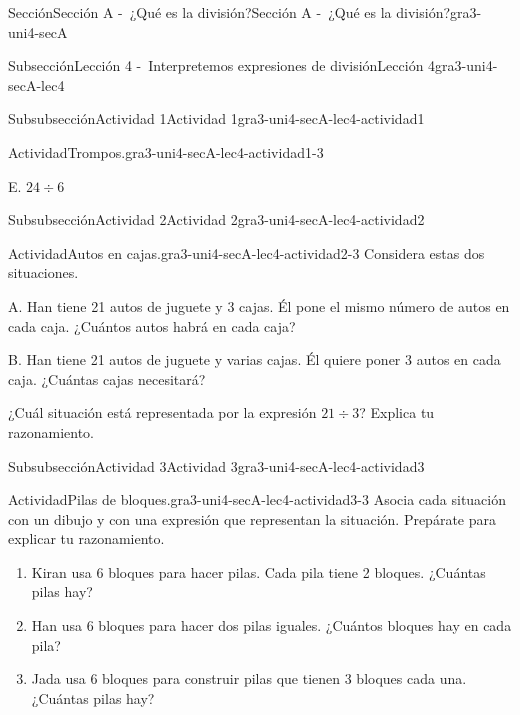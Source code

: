 \documentclass[twoside,10pt,]{article}
\begin{document}
\begin{sectionptx}{Sección}{Sección A -~¿Qué es la división?}{}{Sección A -~¿Qué es la división?}{}{}{gra3-uni4-secA}
\begin{subsectionptx}{Subsección}{Lección 4 -~Interpretemos expresiones de división}{}{Lección 4}{}{}{gra3-uni4-secA-lec4}
\begin{subsubsectionptx}{Subsubsección}{Actividad 1}{}{Actividad 1}{}{}{gra3-uni4-secA-lec4-actividad1}
\begin{activity}{Actividad}{Trompos.}{gra3-uni4-secA-lec4-actividad1-3}
\begin{sidebyside}{2}{0.05}{0}{0.15}
\begin{sbspanel}{0.2}
\par
E. \(24 \div 6\)%
\end{sbspanel}%
\end{sidebyside}%
\end{activity}%
\end{subsubsectionptx}
%
%
\typeout{************************************************}
\typeout{************************************************}
%
\begin{subsubsectionptx}{Subsubsección}{Actividad 2}{}{Actividad 2}{}{}{gra3-uni4-secA-lec4-actividad2}
\begin{activity}{Actividad}{Autos en cajas.}{gra3-uni4-secA-lec4-actividad2-3}%
Considera estas dos situaciones.%
\begin{sidebyside}{2}{0.05}{0.05}{0.1}%
\begin{sbspanel}{0.4}%
A. Han tiene 21 autos de juguete y 3 cajas. Él pone el mismo número de autos en cada caja. ¿Cuántos autos habrá en cada caja?%
\end{sbspanel}%
\begin{sbspanel}{0.4}%
\par
B. Han tiene 21 autos de juguete y varias cajas. Él quiere poner 3 autos en cada caja. ¿Cuántas cajas necesitará?%
\end{sbspanel}%
\end{sidebyside}%
\par
¿Cuál situación está representada por la expresión \(21\div 3\)? Explica tu razonamiento.%
\end{activity}%
\end{subsubsectionptx}
%
%
\typeout{************************************************}
\typeout{************************************************}
%
\begin{subsubsectionptx}{Subsubsección}{Actividad 3}{}{Actividad 3}{}{}{gra3-uni4-secA-lec4-actividad3}
\begin{activity}{Actividad}{Pilas de bloques.}{gra3-uni4-secA-lec4-actividad3-3}%
Asocia cada situación con un dibujo y con una expresión que representan la situación. Prepárate para explicar tu razonamiento.%
%
\begin{enumerate}
\item{}Kiran usa 6 bloques para hacer pilas. Cada pila tiene 2 bloques. ¿Cuántas pilas hay?%
\item{}Han usa 6 bloques para hacer dos pilas iguales. ¿Cuántos bloques hay en cada pila?%
\item{}Jada usa 6 bloques para construir pilas que tienen 3 bloques cada una. ¿Cuántas pilas hay?%

\end{enumerate}
\end{activity}
\end{subsubsectionptx}
\end{subsectionptx}
\end{sectionptx}
\end{document}
